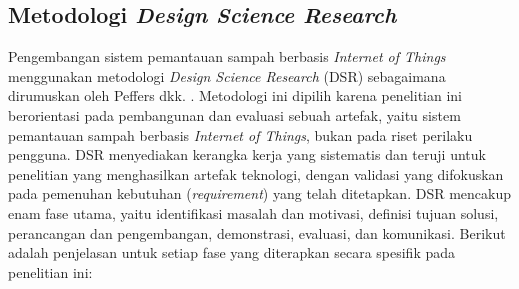 \subsection{Metodologi \textit{Design Science Research}}

Pengembangan sistem pemantauan sampah berbasis \textit{Internet of Things} menggunakan metodologi \textit{Design Science Research} (DSR) sebagaimana dirumuskan oleh Peffers dkk. \autocite{peffers2007}. Metodologi ini dipilih karena penelitian ini berorientasi pada pembangunan dan evaluasi sebuah artefak, yaitu sistem pemantauan sampah berbasis \textit{Internet of Things}, bukan pada riset perilaku pengguna. DSR menyediakan kerangka kerja yang sistematis dan teruji untuk penelitian yang menghasilkan artefak teknologi, dengan validasi yang difokuskan pada pemenuhan kebutuhan (\textit{requirement}) yang telah ditetapkan. DSR mencakup enam fase utama, yaitu identifikasi masalah dan motivasi, definisi tujuan solusi, perancangan dan pengembangan, demonstrasi, evaluasi, dan komunikasi. Berikut adalah penjelasan untuk setiap fase yang diterapkan secara spesifik pada penelitian ini:

